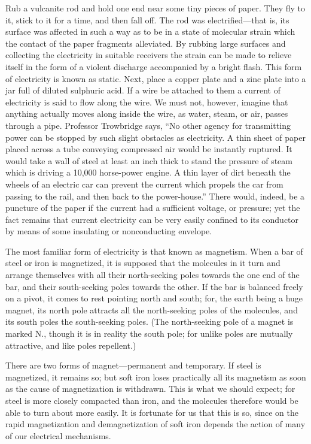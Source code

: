 \begin{linenumbers}
\indent Rub a vulcanite rod and hold one end near some tiny pieces of paper. They fly to it, stick to it for a time, and then fall off. The rod was electrified—that is, its surface was affected in such a way as to be in a state of molecular strain which the contact of the paper fragments alleviated. By rubbing large surfaces and collecting the electricity in suitable receivers the strain can be made to relieve itself in the form of a violent discharge accompanied by a bright flash. This form of electricity is known as static.
Next, place a copper plate and a zinc plate into a jar full of diluted sulphuric acid. If a wire be attached to them a current of electricity is said to flow along the wire. We must not, however, imagine that anything actually moves along inside the wire, as water, steam, or air, passes through a pipe. Professor Trowbridge says, ``No other agency for transmitting power can be stopped by such slight obstacles as electricity. A thin sheet of paper placed across a tube conveying compressed air would be instantly ruptured. It would take a wall of steel at least an inch thick to stand the pressure of steam which is driving a 10,000 horse-power engine. A thin layer of dirt beneath the wheels of an electric car can prevent the current which propels the car from passing to the rail, and then back to the power-house.'' There would, indeed, be a puncture of the paper if the current had a sufficient voltage, or pressure; yet the fact remains that current electricity can be very easily confined to its conductor by means of some insulating or nonconducting envelope.

\indent The most familiar form of electricity is that known as magnetism. When a bar of steel or iron is magnetized, it is supposed that the molecules in it turn and arrange themselves with all their north-seeking poles towards the one end of the bar, and their south-seeking poles towards the other. If the bar is balanced freely on a pivot, it comes to rest pointing north and south; for, the earth being a huge magnet, its north pole attracts all the north-seeking poles of the molecules, and its south poles the south-seeking poles. (The north-seeking pole of a magnet is marked N., though it is in reality the south pole; for unlike poles are mutually attractive, and like poles repellent.)

\indent There are two forms of magnet—permanent and temporary. If steel is magnetized, it remains so; but soft iron loses practically all its magnetism as soon as the cause of magnetization is withdrawn. This is what we should expect; for steel is more closely compacted than iron, and the molecules therefore would be able to turn about more easily. It is fortunate for us that this is so, since on the rapid magnetization and demagnetization of soft iron depends the action of many of our electrical mechanisms.
\end{linenumbers}

